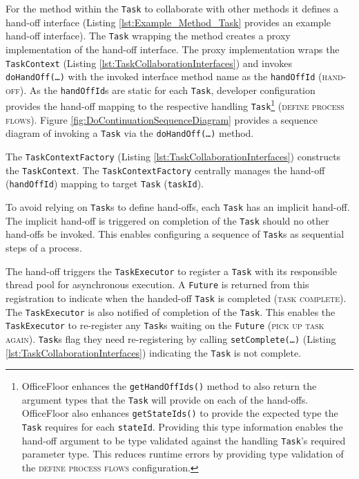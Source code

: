 \documentclass[prodmode]{style/acmlarge}
\begin{document}
For the method within the \texttt{Task} to collaborate with other methods it
defines a hand-off interface (Listing \ref{lst:Example_Method_Task} provides an
example hand-off interface).  The \texttt{Task} wrapping the method creates a
proxy implementation of the hand-off interface.  The proxy implementation wraps
the \texttt{TaskContext} (Listing \ref{lst:TaskCollaborationInterfaces}) and
invokes \texttt{doHandOff(\ldots)} with the invoked interface method name as the
\texttt{handOffId} (\textsc{hand-off}).  As the \texttt{handOffId}s are static
for each \texttt{Task}, developer configuration provides the hand-off mapping to
the respective handling \texttt{Task}\footnote{OfficeFloor enhances the
\texttt{getHandOffIds()} method to also return the argument types that the
\texttt{Task} will provide on each of the hand-offs.  OfficeFloor also enhances
\texttt{getStateIds()} to provide the expected type the \texttt{Task} requires
for each \texttt{stateId}. Providing this type information enables the hand-off
argument to be type validated against the handling \texttt{Task}'s required
parameter type.  This reduces runtime errors by providing type validation of the
\textsc{define process flows} configuration.} (\textsc{define process flows}). 
Figure \ref{fig:DoContinuationSequenceDiagram} provides a sequence diagram of
invoking a \texttt{Task} via the \texttt{doHandOff(\ldots)} method.

The \texttt{TaskContextFactory} (Listing \ref{lst:TaskCollaborationInterfaces})
constructs the \texttt{TaskContext}.  The \texttt{TaskContextFactory} centrally
manages the hand-off (\texttt{handOffId}) mapping to target \texttt{Task}
(\texttt{taskId}).

To avoid relying on \texttt{Task}s to define hand-offs, each \texttt{Task} has
an implicit hand-off.  The implicit hand-off is triggered on completion of the
\texttt{Task} should no other hand-offs be invoked.  This enables configuring a
sequence of \texttt{Task}s as sequential steps of a process.

The hand-off triggers the \texttt{TaskExecutor} to register a \texttt{Task} with
its responsible thread pool for asynchronous execution.  A \texttt{Future} is
returned from this registration to indicate when the handed-off \texttt{Task} is
completed (\textsc{task complete}).  The \texttt{TaskExecutor} is also notified
of completion of the \texttt{Task}.  This enables the \texttt{TaskExecutor} to
re-register any \texttt{Task}s waiting on the \texttt{Future} (\textsc{pick up
task again}).  \texttt{Task}s flag they need re-registering by calling
\texttt{setComplete(\ldots)} (Listing \ref{lst:TaskCollaborationInterfaces})
indicating the \texttt{Task} is not complete.
\end{document}
